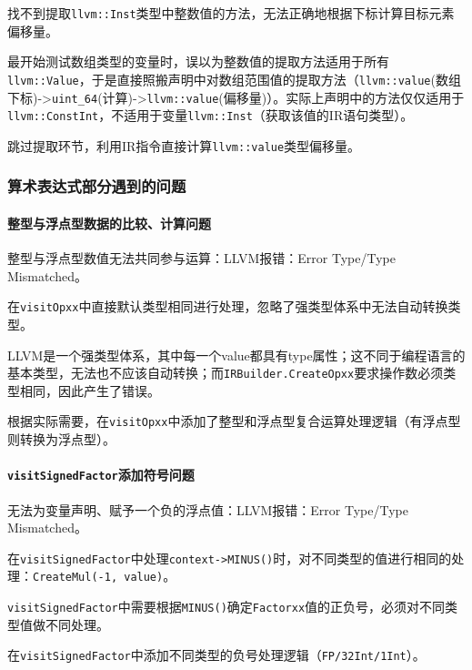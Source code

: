 \documentclass[lang=cn,11pt,a4paper,cite=authornum]{paper}
\begin{document}
找不到提取\texttt{llvm::Inst}类型中整数值的方法，无法正确地根据下标计算目标元素偏移量。

最开始测试数组类型的变量时，误以为整数值的提取方法适用于所有\texttt{llvm::Value}，于是直接照搬声明中对数组范围值的提取方法（\texttt{llvm::value}(数组下标)->\texttt{uint_64}(计算)->\texttt{llvm::value}(偏移量)）。实际上声明中的方法仅仅适用于\texttt{llvm::ConstInt}，不适用于变量\texttt{llvm::Inst}（获取该值的IR语句类型）。

跳过提取环节，利用IR指令直接计算\texttt{llvm::value}类型偏移量。

\subsubsection{算术表达式部分遇到的问题}

\paragraph{整型与浮点型数据的比较、计算问题}

整型与浮点型数值无法共同参与运算：LLVM报错：Error Type/Type Mismatched。

在\texttt{visitOpxx}中直接默认类型相同进行处理，忽略了强类型体系中无法自动转换类型。

LLVM是一个强类型体系，其中每一个value都具有type属性；这不同于编程语言的基本类型，无法也不应该自动转换；而\texttt{IRBuilder.CreateOpxx}要求操作数必须类型相同，因此产生了错误。

根据实际需要，在\texttt{visitOpxx}中添加了整型和浮点型复合运算处理逻辑（有浮点型则转换为浮点型）。

\paragraph{\texttt{visitSignedFactor}添加符号问题}

无法为变量声明、赋予一个负的浮点值：LLVM报错：Error Type/Type Mismatched。

在\texttt{visitSignedFactor}中处理\texttt{context->MINUS()}时，对不同类型的值进行相同的处理：\texttt{CreateMul(-1, value)}。

\texttt{visitSignedFactor}中需要根据\texttt{MINUS()}确定\texttt{Factorxx}值的正负号，必须对不同类型值做不同处理。

在\texttt{visitSignedFactor}中添加不同类型的负号处理逻辑（\texttt{FP/32Int/1Int}）。
\end{document}

